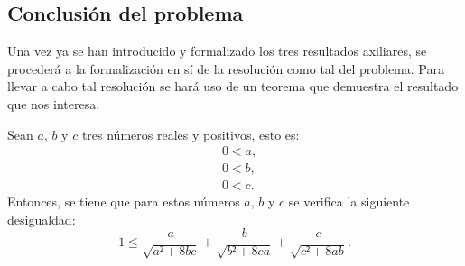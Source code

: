 \subsection{Conclusión del problema}

Una vez ya se han introducido y formalizado los tres resultados
axiliares, se procederá a la formalización en sí de la resolución como
tal del problema. Para llevar a cabo tal resolución se hará uso de un
teorema que demuestra el resultado que nos interesa.

\begin{teorema}
  Sean \(a\), \(b\) y \(c\) tres números reales y positivos, esto es:
  \begin{align}
    &0 < a, \label{haq2te}\tag{ha}\\
    &0 < b, \label{hbq2te}\tag{hb}\\
    &0 < c. \label{hcq2te}\tag{hc}
  \end{align}
  Entonces, se tiene que para estos números \(a\), \(b\) y \(c\) se
  verifica la siguiente desigualdad:
  \begin{equation}\label{eqfinal}
    1 ≤ \frac{a}{\sqrt{a²+8bc}}+\frac{b}{\sqrt{b²+8ca}}+
        \frac{c}{\sqrt{c²+8ab}}.
  \end{equation}
\end{teorema}

